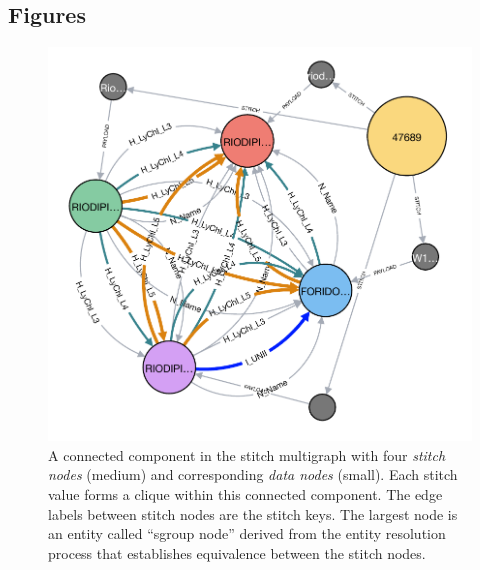 \documentclass{bmcart}
\begin{document}
\begin{backmatter}



\section*{Figures}
\begin{figure}[ht!]
\caption{ A connected component in the
  stitch multigraph with four \emph{stitch nodes} (medium) and
  corresponding \emph{data nodes} (small). Each stitch value forms a
  clique within this connected component. The edge labels between
  stitch nodes are the stitch keys. 
  The largest node is an entity called ``sgroup node'' derived from the entity
  resolution process that establishes equivalence between the stitch 
  nodes.}\label{fig:graph1}
\centerline{\includegraphics[scale=0.5]{graph3}}
\end{figure}


\end{backmatter}
\end{document}
